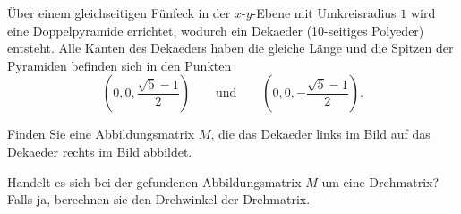 Über einem gleichseitigen Fünfeck in der $x$-$y$-Ebene mit Umkreisradius $1$ 
wird eine Doppelpyramide errichtet, wodurch ein Dekaeder (10-seitiges Polyeder) entsteht.
Alle Kanten des Dekaeders haben die gleiche Länge und die Spitzen der Pyramiden befinden sich
in den Punkten 
\[
\left(0,0,\frac{\sqrt{5}-1}{2}\right) \qquad \text{und}\qquad
\left(0,0,-\frac{\sqrt{5}-1}{2}\right).
\]

\begin{center}
\end{center}

\begin{teilaufgaben}
\item
Finden Sie eine Abbildungsmatrix $M$, die das Dekaeder links im Bild auf das
Dekaeder rechts im Bild abbildet.
\item
Handelt es sich bei der gefundenen Abbildungsmatrix $M$ um eine Drehmatrix?
Falls ja, berechnen sie den Drehwinkel der Drehmatrix.
\end{teilaufgaben}


